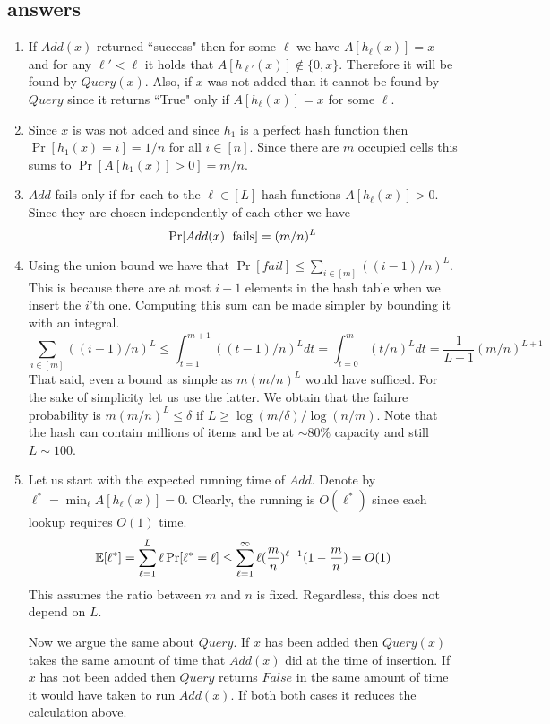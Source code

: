 \subsection*{answers}
\begin{enumerate}
\item If $Add(x)$ returned ``success" then for some $\ell$ we have $A[h_\ell(x)] = x$ and for any $\ell' < \ell$ it holds that $A[h_{\ell'}(x)] \not\in \{0,x\}$. 
Therefore it will be found by $Query(x)$. Also, if $x$ was not added than it cannot be found by $Query$ since it returns ``True" only if $A[h_\ell(x)] = x$ for some $\ell$. 
\item Since $x$ is was not added and since $h_1$ is a perfect hash function then $\Pr[h_1(x) = i]  = 1/n$ for all $i \in [n]$.
Since there are $m$ occupied cells this sums to $\Pr[A[h_1(x)] > 0] = m/n$.
\item $Add$ fails only if for each to the $\ell \in [L]$ hash functions $A[h_\ell(x)] > 0$. Since they are chosen independently of each other we have 
\[
\Pr[Add(x) \mbox{\; fails}]=(m/n)^L
\]
\item Using the union bound we have that $\Pr[fail] \le \sum_{i \in [m]} ((i-1)/n)^L$. This is because there are at most $i-1$ elements in the hash table when we insert the $i$'th one. Computing this sum can be made simpler by bounding it with an integral.
\[
\sum_{i \in [m]} ((i-1)/n)^L \le \int_{t=1}^{m+1}((t-1)/n)^L dt = \int_{t=0}^{m}(t/n)^L dt = \frac{1}{L+1}(m/n)^{L+1}
\] 
That said, even a bound as simple as $m (m/n)^L$ would have sufficed. For the sake of simplicity let us use the latter.
We obtain that the failure probability is $m (m/n)^L \le \delta$ if $L \ge \log(m/\delta)/\log(n/m)$.
Note that the hash can contain millions of items and be at $\sim 80\%$ capacity and still $L \sim 100$.
\item Let us start with the expected running time of $Add$.  Denote by $\ell^{*} = \min_\ell A[h_\ell(x)] = 0$. 
Clearly, the running is $O(\ell^{*})$ since each lookup requires $O(1)$ time.
\[
{\mathbb E}[\ell^{*}] = \sum_{\ell=1}^{L} \ell  \Pr[\ell^{*} = \ell] \le  \sum_{\ell=1}^{\infty} \ell (\frac{m}{n})^{\ell-1}  (1- \frac{m}{n}) = O(1)
\]
This assumes the ratio between $m$ and $n$ is fixed. Regardless, this does not depend on $L$.

Now we argue the same about $Query$. If $x$ has been added then $Query(x)$ takes the same amount of time that $Add(x)$ did at the time of insertion.
If $x$ has not been added then $Query$ returns $False$ in the same amount of time it would have taken to run $Add(x)$.
If both both cases it reduces the calculation above.





\end{enumerate}


